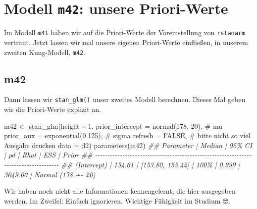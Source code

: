 \documentclass[
  a4paper,
  DIV=11]{scrreprt}
\newenvironment{Shaded}{\begin{snugshade}}{\end{snugshade}}
\newcommand{\AttributeTok}[1]{\textcolor[rgb]{0.40,0.45,0.13}{#1}}
\newcommand{\CommentTok}[1]{\textcolor[rgb]{0.37,0.37,0.37}{#1}}
\newcommand{\ConstantTok}[1]{\textcolor[rgb]{0.56,0.35,0.01}{#1}}
\newcommand{\DecValTok}[1]{\textcolor[rgb]{0.68,0.00,0.00}{#1}}
\newcommand{\DocumentationTok}[1]{\textcolor[rgb]{0.37,0.37,0.37}{\textit{#1}}}
\newcommand{\FloatTok}[1]{\textcolor[rgb]{0.68,0.00,0.00}{#1}}
\newcommand{\FunctionTok}[1]{\textcolor[rgb]{0.28,0.35,0.67}{#1}}
\newcommand{\NormalTok}[1]{\textcolor[rgb]{0.00,0.23,0.31}{#1}}
\newcommand{\OtherTok}[1]{\textcolor[rgb]{0.00,0.23,0.31}{#1}}
\newcommand{\SpecialCharTok}[1]{\textcolor[rgb]{0.37,0.37,0.37}{#1}}
\theoremstyle{definition}
\theoremstyle{remark}
\begin{document}
\hypertarget{modell-m42-unsere-priori-werte}{%
\section{\texorpdfstring{Modell \texttt{m42}: unsere
Priori-Werte}{Modell m42: unsere Priori-Werte}}\label{modell-m42-unsere-priori-werte}}

Im Modell \texttt{m41} haben wir auf die Priori-Werte der Voreinstellung
von \texttt{rstanarm} vertraut. Jetzt lassen wir mal unsere eigenen
Priori-Werte einfließen, in unserem zweiten Kung-Modell, \texttt{m42}.

\hypertarget{m42}{%
\subsection{m42}\label{m42}}

Dann lassen wir \texttt{stan\_glm()} unser zweites Modell berechnen.
Dieses Mal geben wir die Priori-Werte explizit an.

\begin{Shaded}
\begin{Highlighting}[]
\NormalTok{m42 }\OtherTok{\textless{}{-}} 
  \FunctionTok{stan\_glm}\NormalTok{(height }\SpecialCharTok{\textasciitilde{}} \DecValTok{1}\NormalTok{, }
           \AttributeTok{prior\_intercept =} \FunctionTok{normal}\NormalTok{(}\DecValTok{178}\NormalTok{, }\DecValTok{20}\NormalTok{),  }\CommentTok{\# mu}
           \AttributeTok{prior\_aux =} \FunctionTok{exponential}\NormalTok{(}\FloatTok{0.125}\NormalTok{),  }\CommentTok{\# sigma}
           \AttributeTok{refresh =} \ConstantTok{FALSE}\NormalTok{,  }\CommentTok{\# bitte nicht so viel Ausgabe drucken}
           \AttributeTok{data =}\NormalTok{ d2)}
\FunctionTok{parameters}\NormalTok{(m42)}
\DocumentationTok{\#\# Parameter   | Median |           95\% CI |   pd |  Rhat |     ESS |              Prior}
\DocumentationTok{\#\# {-}{-}{-}{-}{-}{-}{-}{-}{-}{-}{-}{-}{-}{-}{-}{-}{-}{-}{-}{-}{-}{-}{-}{-}{-}{-}{-}{-}{-}{-}{-}{-}{-}{-}{-}{-}{-}{-}{-}{-}{-}{-}{-}{-}{-}{-}{-}{-}{-}{-}{-}{-}{-}{-}{-}{-}{-}{-}{-}{-}{-}{-}{-}{-}{-}{-}{-}{-}{-}{-}{-}{-}{-}{-}{-}{-}{-}{-}{-}{-}{-}{-}{-}{-}{-}}
\DocumentationTok{\#\# (Intercept) | 154.61 | [153.80, 155.42] | 100\% | 0.999 | 3049.00 | Normal (178 +{-} 20)}
\end{Highlighting}
\end{Shaded}

Wir haben noch nicht alle Informationen kennengelernt, die hier
ausgegeben werden. Im Zweifel: Einfach ignorieren. Wichtige Fähigkeit im
Studium 🤓.
\end{document}

